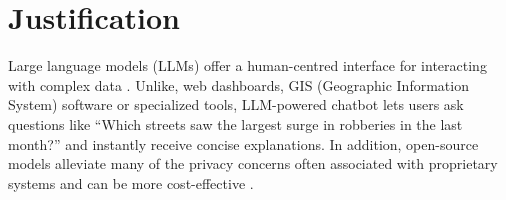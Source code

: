 



\section{Justification}



Large language models (LLMs) offer a human-centred interface for interacting with complex data \citep{Yang2024HumanAIInteraction, Pappula2023LLMsFC}. Unlike, web dashboards, GIS (Geographic Information System) software or specialized tools, LLM-powered chatbot lets users ask questions like ``Which streets saw the largest surge in robberies in the last month?'' and instantly receive concise explanations. In addition, open-source models alleviate many of the privacy concerns \citep{Temsah2025DeepSeek, Ersoz2025CrimePredictionXAISurvey} often associated with proprietary systems and can be more cost-effective \citep{Liu2024NLDriven}. 

